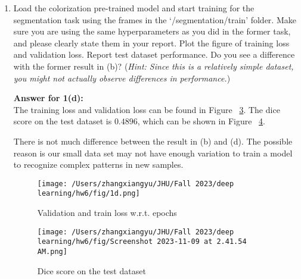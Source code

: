 \documentclass[a4paper]{article}
\begin{document}
\begin{enumerate}
\begin{enumerate}
			\noindent \textbf{Answer for 1(c):} \\

			The training loss of colorization task can be found in Figure ~\ref{fig:1c}. 

			\begin{figure}[H]
				\centering
				\texttt{[image: /Users/zhangxiangyu/JHU/Fall 2023/deep learning/hw6/fig/loss.png]}
				\caption{Training loss of colorization task}
				\label{fig:1c}
			\end{figure}

			And the recolorized images can be found in Figure ~\ref{fig:1c_color}.

			\begin{figure}[H]
				\centering
				\texttt{[image: /Users/zhangxiangyu/JHU/Fall 2023/deep learning/hw6/fig/recolorization.png]}
				\caption{Recolorized images}
				\label{fig:1c_color}
			\end{figure}


			\item Load the colorization pre-trained model and start training for the segmentation task using the frames in the `/segmentation/train' folder. Make sure you are using the same hyperparameters as you did in the former task, and please clearly state  them in your report. Plot the figure of training loss and validation loss. Report test dataset performance. Do you see a difference with the former result in (b)? (\textit{Hint: Since this is a relatively simple dataset, you might not actually observe differences in performance.})  
			
			\noindent \textbf{Answer for 1(d):} \\	

			The training loss and validation loss can be found in Figure ~\ref{fig:1d}. The dice score on the test dataset is $0.4896$, which can be shown in Figure ~\ref{fig:1d_dice}.

			There is not much difference between the result in (b) and (d). The possible reason is our small data set may not have enough variation to train a model to recognize complex patterns in new samples.
			\begin{figure}[H]
				\centering
				\texttt{[image: /Users/zhangxiangyu/JHU/Fall 2023/deep learning/hw6/fig/1d.png]}
				\caption{Validation and train loss w.r.t. epochs}
				\label{fig:1d}
			\end{figure}

			\begin{figure}[H]
				\centering
				\texttt{[image: /Users/zhangxiangyu/JHU/Fall 2023/deep learning/hw6/fig/Screenshot 2023-11-09 at 2.41.54 AM.png]}
				\caption{Dice score on the test dataset}
				\label{fig:1d_dice}
			\end{figure}




\end{enumerate}
\end{enumerate}
\end{document}
